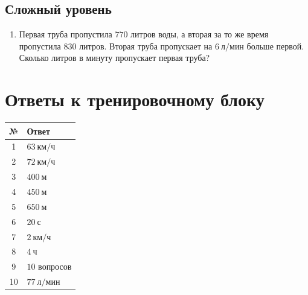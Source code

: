 \documentclass[a4paper,12pt]{article}
\newcommand{\kmh}{\text{км/ч}}
\newcommand{\ch}{\text{ч}}
\newcommand{\ssec}{\text{с}}
\newcommand{\m}{\text{м}}
\newcommand{\lpm}{\text{л/мин}}
\begin{document}
\subsection*{Сложный уровень}

\begin{enumerate}[resume]
    \item Первая труба пропустила $770$ литров воды, а вторая за то же время пропустила $830$ литров. Вторая труба пропускает на $6\ \lpm$ больше первой. Сколько литров в минуту пропускает первая труба?
\end{enumerate}

\newpage

\section{Ответы к тренировочному блоку}

\begin{center}
\renewcommand{\arraystretch}{1.35}
\begin{tabularx}{0.9\linewidth}{c X}
\toprule
\textbf{№} & \textbf{Ответ} \\
\midrule
1 & $63\ \kmh$ \\
2 & $72\ \kmh$ \\
3 & $400\ \m$ \\
4 & $450\ \m$ \\
5 & $650\ \m$ \\
6 & $20\ \ssec$ \\
7 & $2\ \kmh$ \\
8 & $4\ \ch$ \\
9 & $10$ вопросов \\
10 & $77\ \lpm$ \\
\bottomrule
\end{tabularx}
\end{center}
\end{document}
